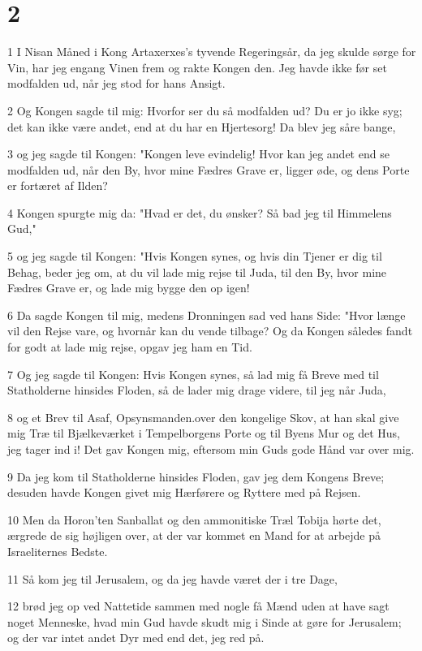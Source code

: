 \chapter{2}

\par 1 I Nisan Måned i Kong Artaxerxes's tyvende Regeringsår, da jeg skulde sørge for Vin, har jeg engang Vinen frem og rakte Kongen den. Jeg havde ikke før set modfalden ud, når jeg stod for hans Ansigt.
\par 2 Og Kongen sagde til mig: Hvorfor ser du så modfalden ud? Du er jo ikke syg; det kan ikke være andet, end at du har en Hjertesorg! Da blev jeg såre bange,
\par 3 og jeg sagde til Kongen: "Kongen leve evindelig! Hvor kan jeg andet end se modfalden ud, når den By, hvor mine Fædres Grave er, ligger øde, og dens Porte er fortæret af Ilden?
\par 4 Kongen spurgte mig da: "Hvad er det, du ønsker? Så bad jeg til Himmelens Gud,"
\par 5 og jeg sagde til Kongen: "Hvis Kongen synes, og hvis din Tjener er dig til Behag, beder jeg om, at du vil lade mig rejse til Juda, til den By, hvor mine Fædres Grave er, og lade mig bygge den op igen!
\par 6 Da sagde Kongen til mig, medens Dronningen sad ved hans Side: "Hvor længe vil den Rejse vare, og hvornår kan du vende tilbage? Og da Kongen således fandt for godt at lade mig rejse, opgav jeg ham en Tid.
\par 7 Og jeg sagde til Kongen: Hvis Kongen synes, så lad mig få Breve med til Statholderne hinsides Floden, så de lader mig drage videre, til jeg når Juda,
\par 8 og et Brev til Asaf, Opsynsmanden.over den kongelige Skov, at han skal give mig Træ til Bjælkeværket i Tempelborgens Porte og til Byens Mur og det Hus, jeg tager ind i! Det gav Kongen mig, eftersom min Guds gode Hånd var over mig.
\par 9 Da jeg kom til Statholderne hinsides Floden, gav jeg dem Kongens Breve; desuden havde Kongen givet mig Hærførere og Ryttere med på Rejsen.
\par 10 Men da Horon'ten Sanballat og den ammonitiske Træl Tobija hørte det, ærgrede de sig højligen over, at der var kommet en Mand for at arbejde på Israeliternes Bedste.
\par 11 Så kom jeg til Jerusalem, og da jeg havde været der i tre Dage,
\par 12 brød jeg op ved Nattetide sammen med nogle få Mænd uden at have sagt noget Menneske, hvad min Gud havde skudt mig i Sinde at gøre for Jerusalem; og der var intet andet Dyr med end det, jeg red på.
